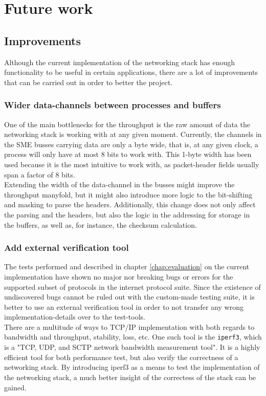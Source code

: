 \chapter{Future work}
\label{chap:future_work}

\section{Improvements}
Although the current implementation of the networking stack has enough
functionality to be useful in certain applications, there are a lot of
improvements that can be carried out in order to better the project.


\subsection{Wider data-channels between processes and buffers}
One of the main bottlenecks for the throughput is the raw amount of data the
networking stack is working with at any given moment. Currently, the channels in
the SME busses carrying data are only a byte wide, that is, at any given clock,
a process will only have at most 8 bits to work with.
This 1-byte width has been used because it is the most intuitive to work with,
as packet-header fields usually span a factor of 8 bits.\\
Extending the width of the data-channel in the busses might improve the
throughput manyfold, but it might also introduce more logic to the bit-shifting
and masking to parse the headers. Additionally, this change does not only affect
the parsing and the headers, but also the logic in the addressing for storage
in the buffers, as well as, for instance, the checksum calculation.

\subsection{Add external verification tool}
The tests performed and described in chapter \ref{chap:evaluation} on the
current implementation have shown no major nor breaking bugs or errors for
the supported subset of protocols in the internet protocol suite.
Since the existence of undiscovered bugs cannot be ruled out with the
custom-made testing suite, it is better to use an external verification tool in
order to not transfer any wrong implementation-details over to the
test-tools.\\
There are a multitude of ways to TCP/IP implementation with both regards to
bandwidth and throughput, stability, loss, etc.
One such tool is the \texttt{iperf3}, which is a "TCP, UDP, and SCTP network
bandwidth measurement tool"\cite{iperf3}. It is a highly efficient tool for
both performance test, but also verify the correctness of a networking stack.
By introducing iperf3 as a means to test the implementation of the networking
stack, a much better insight of the correctess of the stack can be gained.


